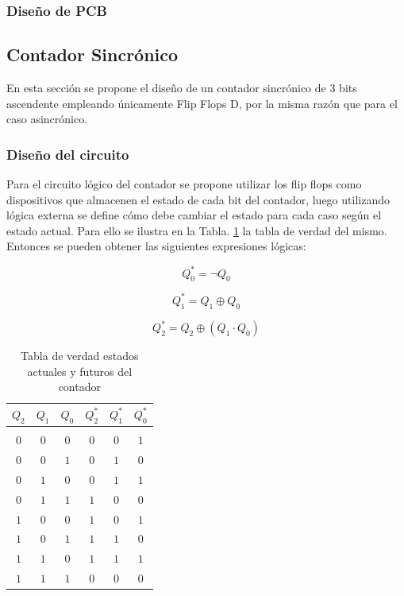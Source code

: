 \subsubsection{Dise\~no de PCB}

\subsection{Contador Sincr\'onico}
En esta secci\'on se propone el dise\~no de un contador sincr\'onico de 3 bits ascendente empleando \'unicamente Flip Flops D, por la misma raz\'on que para el caso asincr\'onico.

\subsubsection{Dise\~no del circuito}
Para el circuito l\'ogico del contador se propone utilizar los flip flops como dispositivos que almacenen el estado de cada bit del contador,
luego utilizando l\'ogica externa se define c\'omo debe cambiar el estado para cada caso seg\'un el estado actual. Para ello se ilustra en la Tabla. \ref{table:tabla_verdad_contador}
la tabla de verdad del mismo. Entonces se pueden obtener las siguientes expresiones l\'ogicas:

\begin{equation}
    Q^{*}_0 = \neg Q_0 
\end{equation}

\begin{equation}
    Q^{*}_1 = Q_1 \oplus Q_0 
\end{equation}

\begin{equation}
    Q^{*}_2 = Q_2 \oplus (Q_1 \cdot Q_0) 
\end{equation}

\begin{table}[H]
    \centering
    \begin{tabular}{c c c | c c c}
        $Q_2$ & $Q_1$ & $Q_0$ & $Q^{*}_2$ & $Q^{*}_1$ & $Q^{*}_0$ \\ 
        \hline \\
        $0$ & $0$ & $0$ & $0$ & $0$ & $1$ \\
        $0$ & $0$ & $1$ & $0$ & $1$ & $0$ \\
        $0$ & $1$ & $0$ & $0$ & $1$ & $1$ \\
        $0$ & $1$ & $1$ & $1$ & $0$ & $0$ \\
        $1$ & $0$ & $0$ & $1$ & $0$ & $1$ \\
        $1$ & $0$ & $1$ & $1$ & $1$ & $0$ \\
        $1$ & $1$ & $0$ & $1$ & $1$ & $1$ \\
        $1$ & $1$ & $1$ & $0$ & $0$ & $0$ \\
    \end{tabular}
    \caption{Tabla de verdad estados actuales y futuros del contador}
    \label{table:tabla_verdad_contador}
\end{table}

